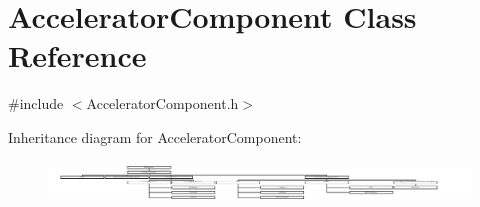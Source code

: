\hypertarget{classAcceleratorComponent}{}\section{Accelerator\+Component Class Reference}
\label{classAcceleratorComponent}


{\ttfamily \#include $<$Accelerator\+Component.\+h$>$}

Inheritance diagram for Accelerator\+Component\+:\begin{figure}[H]
\begin{center}
\leavevmode
\includegraphics[height=1.102672cm]{classAcceleratorComponent}
\end{center}
\end{figure}
